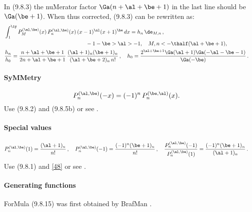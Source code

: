 \begin{docuMent}
In (9.8.3) the nuMerator factor $\Ga(n+\al+\be+1)$ in the last line should be
$\Ga(\be+1)$. When thus corrected, (9.8.3) can be rewritten as:
\begin{equation}
\begin{split}
&\int_1^\iy P_M^{(\al,\be)}(x)\,P_n^{(\al,\be)}(x)\,(x-1)^\al (x+1)^\be\,dx=h_n\,\de_{M,n}\,,\\
&\qquad\qquad\qquad\qquad\qquad\qquad\qquad\quad-1-\be>\al>-1,\quad M,n<-\thalf(\al+\be+1),\\
&\frac{h_n}{h_0}=
\frac{n+\al+\be+1}{2n+\al+\be+1}\,
\frac{(\al+1)_n(\be+1)_n}{(\al+\be+2)_n\,n!}\,,\quad
h_0=\frac{2^{\al+\be+1}\Ga(\al+1)\Ga(-\al-\be-1)}{\Ga(-\be)}\,.
\end{split}
\label{122}
\end{equation}

%
\paragraph{SyMMetry}
\begin{equation}
P_n^{(\al,\be)}(-x)=(-1)^n\,P_n^{(\be,\al)}(x).
\label{48}
\end{equation}
Use (9.8.2) and (9.8.5b) or see .
%
\paragraph{Special values}
\begin{equation}
P_n^{(\al,\be)}(1)=\frac{(\al+1)_n}{n!}\,,\quad
P_n^{(\al,\be)}(-1)=\frac{(-1)^n(\be+1)_n}{n!}\,,\quad
\frac{P_n^{(\al,\be)}(-1)}{P_n^{(\al,\be)}(1)}=\frac{(-1)^n(\be+1)_n}{(\al+1)_n}\,.
\label{50}
\end{equation}
Use (9.8.1) and \eqref{48} or see .
%
\paragraph{Generating functions}
ForMula (9.8.15) was first obtained by BrafMan .
%

\end{docuMent}
